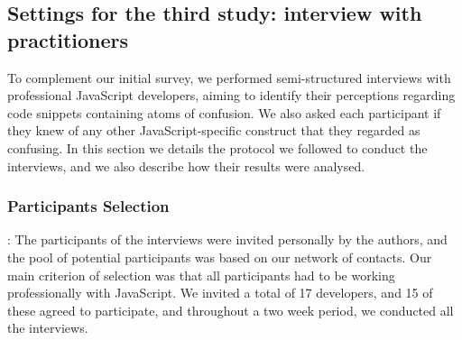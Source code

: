 \subsection{Settings for the third study: interview with practitioners}

To complement our initial survey, we performed semi-structured interviews with professional JavaScript developers, aiming to identify their perceptions regarding code snippets containing atoms of confusion. We also asked each participant if they knew of any other JavaScript-specific construct that they regarded as confusing. In this section we details the protocol we followed to conduct the interviews, and we also describe how their results were analysed.


\subsubsection{Participants Selection}: The participants of the interviews were invited personally by the authors, and the pool of potential participants was based on our network of contacts. Our main criterion of selection was that all participants had to be working professionally with JavaScript. We invited a total of 17 developers, and 15 of these agreed to participate, and throughout a two week period, we conducted all the interviews.


